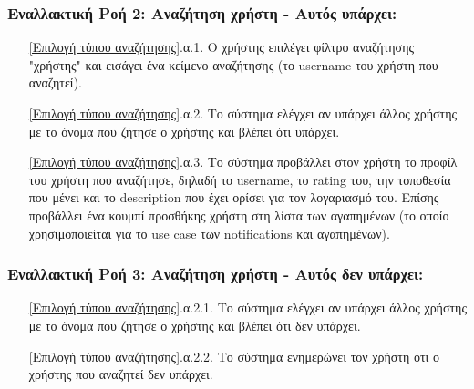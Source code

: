 \documentclass[12pt,a4paper]{article}
\begin{document}
\subsubsection*{Εναλλακτική Ροή 2: Αναζήτηση χρήστη - Αυτός υπάρχει:}
\begin{enumerate}
    \item[\ref{Επιλογή τύπου αναζήτησης}.α.1.] Ο χρήστης επιλέγει φίλτρο αναζήτησης "χρήστης" και εισάγει ένα κείμενο αναζήτησης (το username του χρήστη που αναζητεί).
    \item[\ref{Επιλογή τύπου αναζήτησης}.α.2.] Το σύστημα ελέγχει αν υπάρχει άλλος χρήστης με το όνομα που ζήτησε ο χρήστης και βλέπει ότι υπάρχει.
    \item[\ref{Επιλογή τύπου αναζήτησης}.α.3.] Το σύστημα προβάλλει στον χρήστη το προφίλ του χρήστη που αναζήτησε, δηλαδή το username, το rating του, την τοποθεσία που μένει και το description που έχει ορίσει για τον λογαριασμό του. Επίσης προβάλλει ένα κουμπί προσθήκης χρήστη στη λίστα των αγαπημένων (το οποίο χρησιμοποιείται για το use case των notifications και αγαπημένων).
\end{enumerate}

\subsubsection*{Εναλλακτική Ροή 3: Αναζήτηση χρήστη - Αυτός δεν υπάρχει:}
\begin{enumerate}
    \item[\ref{Επιλογή τύπου αναζήτησης}.α.2.1.] Το σύστημα ελέγχει αν υπάρχει άλλος χρήστης με το όνομα που ζήτησε ο χρήστης και βλέπει ότι δεν υπάρχει.
    \item[\ref{Επιλογή τύπου αναζήτησης}.α.2.2.] Το σύστημα ενημερώνει τον χρήστη ότι ο χρήστης που αναζητεί δεν υπάρχει.
\end{enumerate}
\end{document}
